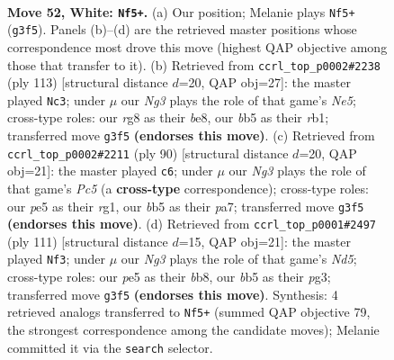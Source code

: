 \documentclass[11pt]{article}
\begin{document}
\clearpage

\begin{figure}[p]\centering
\begin{subfigure}{0.46\textwidth}\centering
\resizebox{\linewidth}{!}{%
\newchessgame
\chessboard[
  setfen={6r1/4k3/8/1b2p3/pP4P1/R3K1N1/8/8 w - - 3 52},
  showmover=false,
  pgfstyle=straightmove, color=movearrow, markmove={g3-f5}
]}
\caption{}
\end{subfigure}\hfill
\begin{subfigure}{0.46\textwidth}\centering
\resizebox{\linewidth}{!}{%
\newchessgame
\chessboard[
  setfen={4B3/8/8/r3k1pp/P3n3/8/6KP/1R6 b - - 5 57},
  showmover=false,
  pgfstyle=straightmove, color=movearrow, markmove={e4-c3}
]}
\caption{}
\end{subfigure}
\\[4pt]
\begin{subfigure}{0.46\textwidth}\centering
\resizebox{\linewidth}{!}{%
\newchessgame
\chessboard[
  setfen={1k6/p6p/7R/2P5/7K/8/P7/6r1 w - - 12 46},
  showmover=false,
  pgfstyle=straightmove, color=movearrow, markmove={c5-c6}
]}
\caption{}
\end{subfigure}\hfill
\begin{subfigure}{0.46\textwidth}\centering
\resizebox{\linewidth}{!}{%
\newchessgame
\chessboard[
  setfen={1B6/6R1/4k3/8/1P1n2p1/6P1/1r6/5K2 b - - 3 56},
  showmover=false,
  pgfstyle=straightmove, color=movearrow, markmove={d4-f3}
]}
\caption{}
\end{subfigure}
\caption{\textbf{Move 52, White: \texttt{Nf5+}.} (a) Our position; Melanie plays \texttt{Nf5+} (\texttt{g3f5}). Panels (b)--(d) are the retrieved master positions whose correspondence most drove this move (highest QAP objective among those that transfer to it). (b) Retrieved from \texttt{ccrl\_top\_p0002\#2238} (ply 113) [structural distance $d$=20, QAP obj=27]: the master played \texttt{Nc3}; under $\mu$ our \emph{Ng3} plays the role of that game's \emph{Ne5}; cross-type roles: our \emph{r}g8 as their \emph{b}e8, our \emph{b}b5 as their \emph{r}b1; transferred move \texttt{g3f5} \textbf{(endorses this move)}. (c) Retrieved from \texttt{ccrl\_top\_p0002\#2211} (ply 90) [structural distance $d$=20, QAP obj=21]: the master played \texttt{c6}; under $\mu$ our \emph{Ng3} plays the role of that game's \emph{Pc5} (a \textbf{cross-type} correspondence); cross-type roles: our \emph{p}e5 as their \emph{r}g1, our \emph{b}b5 as their \emph{p}a7; transferred move \texttt{g3f5} \textbf{(endorses this move)}. (d) Retrieved from \texttt{ccrl\_top\_p0001\#2497} (ply 111) [structural distance $d$=15, QAP obj=21]: the master played \texttt{Nf3}; under $\mu$ our \emph{Ng3} plays the role of that game's \emph{Nd5}; cross-type roles: our \emph{p}e5 as their \emph{b}b8, our \emph{b}b5 as their \emph{p}g3; transferred move \texttt{g3f5} \textbf{(endorses this move)}. Synthesis: 4 retrieved analogs transferred to \texttt{Nf5+} (summed QAP objective 79, the strongest correspondence among the candidate moves); Melanie committed it via the \texttt{search} selector.}
\label{fig:thought-m102}
\end{figure}
\end{document}
